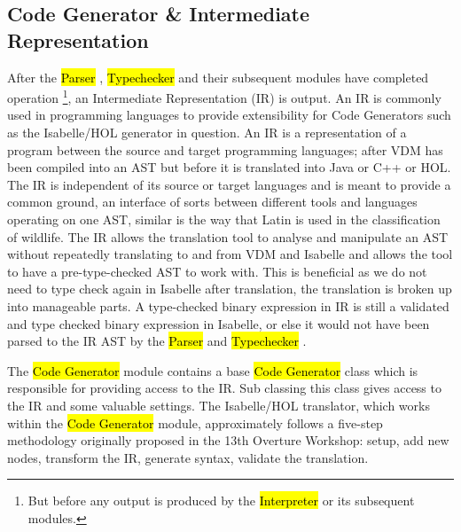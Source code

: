 \subsection{Code Generator \& Intermediate Representation}
After the \ttfamily\hl{Parser} \rmfamily, \ttfamily\hl{Typechecker} \rmfamily and their subsequent modules have completed operation \footnote{But before any output is produced by the \ttfamily\hl{Interpreter} \rmfamily or its subsequent modules.}, an Intermediate Representation (IR) is output. An IR is commonly used in programming languages to provide extensibility for Code Generators such as the Isabelle/HOL generator in question. An IR is a representation of a program between the source and target programming languages; after VDM has been compiled into an AST but before it is translated into Java or C++ or HOL. The IR is independent of its source or target languages and is meant to provide a common ground, an interface of sorts between different tools and languages operating on one AST, similar is the way that Latin is used in the classification of wildlife. The IR allows the translation tool to analyse and manipulate an AST without repeatedly translating to and from VDM and Isabelle and allows the tool to have a pre-type-checked AST to work with. This is beneficial as we do not need to type check again in Isabelle after translation, the translation is broken up into manageable parts. A type-checked binary expression in IR is still a validated and type checked binary expression in Isabelle, or else it would not have been parsed to the IR AST by the \ttfamily\hl{Parser} \rmfamily and \ttfamily\hl{Typechecker} \rmfamily.

The \ttfamily\hl{Code Generator} \rmfamily module contains a base \ttfamily\hl{Code Generator} \rmfamily class which is responsible for providing access to the IR. Sub classing this class gives access to the IR and some valuable settings. The Isabelle/HOL translator, which works within the \ttfamily\hl{Code Generator} \rmfamily module, approximately follows a five-step methodology originally proposed in the 13th Overture Workshop\parencite{overtureproceedings}: setup, add new nodes, transform the IR, generate syntax, validate the translation.  

